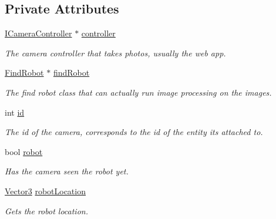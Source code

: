 \subsection*{Private Attributes}
\begin{DoxyCompactItemize}
\item 
\mbox{\label{classCamera_aca1a708bb6132877f6be0b62cfe2c834}} 
\hyperlink{classICameraController}{I\+Camera\+Controller} $\ast$ \hyperlink{classCamera_aca1a708bb6132877f6be0b62cfe2c834}{controller}
\begin{DoxyCompactList}\small\item\em The camera controller that takes photos, usually the web app. \end{DoxyCompactList}\item 
\mbox{\label{classCamera_a525dfb163566c33bcbf439714bc4f352}} 
\hyperlink{classFindRobot}{Find\+Robot} $\ast$ \hyperlink{classCamera_a525dfb163566c33bcbf439714bc4f352}{find\+Robot}
\begin{DoxyCompactList}\small\item\em The find robot class that can actually run image processing on the images. \end{DoxyCompactList}\item 
\mbox{\label{classCamera_a4777e12d1a1138468a2d9023d8bff4ec}} 
int \hyperlink{classCamera_a4777e12d1a1138468a2d9023d8bff4ec}{id}
\begin{DoxyCompactList}\small\item\em The id of the camera, corresponds to the id of the entity it\textquotesingle{}s attached to. \end{DoxyCompactList}\item 
\mbox{\label{classCamera_a80a8ae81e244769c5d5c36c6c994a04b}} 
bool \hyperlink{classCamera_a80a8ae81e244769c5d5c36c6c994a04b}{robot}
\begin{DoxyCompactList}\small\item\em Has the camera seen the robot yet. \end{DoxyCompactList}\item 
\mbox{\label{classCamera_a38e395108a9ba7b0e0ce2d1110ec70d9}} 
\hyperlink{classVector3}{Vector3} \hyperlink{classCamera_a38e395108a9ba7b0e0ce2d1110ec70d9}{robot\+Location}
\begin{DoxyCompactList}\small\item\em Gets the robot location. \end{DoxyCompactList}\end{DoxyCompactItemize}


